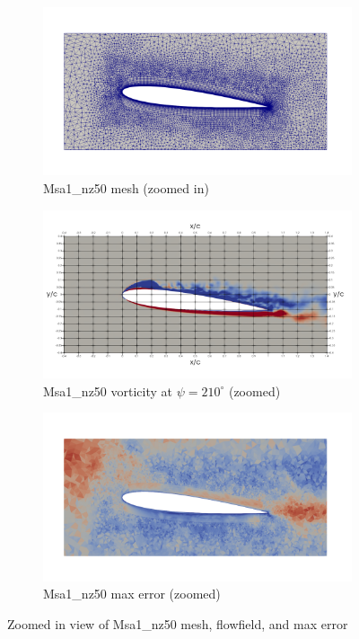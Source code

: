 \begin{figure}[H]
	\centering
	\begin{subfigure}[b]{0.7\textwidth}
		\centering
		\includegraphics[width=1\textwidth]{figures/adapt_strat/zoomed/Msa1_mesh.png}
		\caption{Msa1\_nz50 mesh (zoomed in)}
		\label{fig:Msa1_mesh_zoomed}
	\end{subfigure}
	\begin{subfigure}[b]{0.7\textwidth}
		\centering
		\includegraphics[width=1\textwidth]{figures/adapt_strat/zoomed/Msa1_ph_210.png}
		\caption{Msa1\_nz50 vorticity at $\psi=210^\circ$ (zoomed)}
		\label{fig:Msa1_vorticity_zoomed}
	\end{subfigure}
	\begin{subfigure}[b]{0.7\textwidth}
		\centering
		\includegraphics[width=1\textwidth]{figures/adapt_strat/zoomed/Msa1_max_error.png}
		\caption{Msa1\_nz50 max error (zoomed)}
		\label{fig:Msa1_max_error_zoomed}
	\end{subfigure}
	
	
	\label{fig:Msa1_zoomed}
	\caption{Zoomed in view of Msa1\_nz50 mesh, flowfield, and max error}
\end{figure}


